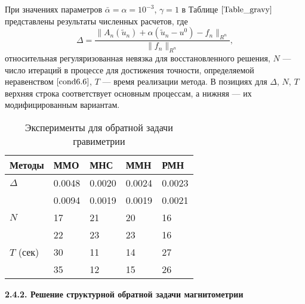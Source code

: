 При значениях параметров $\bar\alpha=\alpha=10^{-3}$, $\gamma=1$ в Таблице $\ref{Table_gravy}$ представлены результаты численных расчетов, где
\begin{equation}\label{form6.7}
\Delta=\frac{\|A_n(\tilde{u}_n)+\alpha(\tilde{u}_n-u^0)-f_n\|_{R^n}}{\|f_n\|_{R^n}},
\end{equation}
относительная регуляризованная невязка для восстановленного решения, $N$ --- число итераций в процессе для достижения точности, определяемой неравенством $\eqref{cond6.6}$, $T$ --- время реализации метода. В позициях для $\Delta$, $N$, $T$ верхняя строка соответствует основным процессам, а нижняя --- их модифицированным вариантам.
\begin{table}[H]
	\centering
	\renewcommand{\arraystretch}{1.5}
	\caption{Эксперименты для обратной задачи гравиметрии}
	\label{Table_gravy}
	\begin{tabular}{|p{}|p{}|p{}|p{}|p{}|}
		\hline
		\rule{0cm}{0.5cm}
		\textbf{Методы} & \textbf{ММО} & \textbf{МНС} & \textbf{ММН} & \textbf{РМН} \\ \hline
		\rule{0cm}{0.5cm}
		{$\Delta$} & 0.0048 & 0.0020 & 0.0024 & 0.0023	 \\ \cline{2-5} 
		\rule{0cm}{0.5cm}
		&  0.0094   & 0.0019    &  0.0019   &  0.0021   \\ \hline
		\rule{0cm}{0.5cm}
		{$N$} & 17  &  21   &   20  &  16    \\ \cline{2-5}
		\rule{0cm}{0.5cm}
		&  22   &   23  &  23   &  16   \\ \hline
		\rule{0cm}{0.5cm}
		{$T$ (сек)}    &  30   &  11   &  14  & 27    \\ \cline{2-5}
		\rule{0cm}{0.5cm}
		& 35   & 12    &  15   &   26  \\ \hline
	\end{tabular}
\end{table}

{\bfseries 2.4.2. Решение структурной обратной задачи магнитометрии}
 
